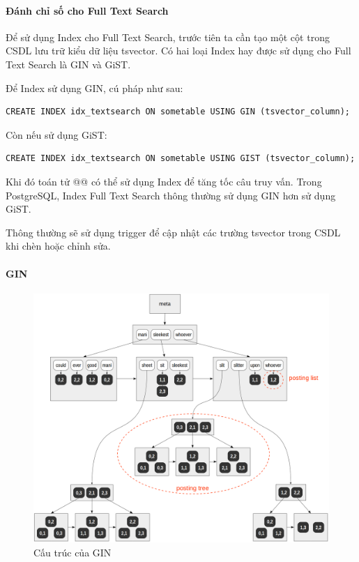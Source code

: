 \paragraph{Đánh chỉ số cho Full Text Search}
Để sử dụng Index cho Full Text Search, trước tiên ta cần tạo
một cột trong CSDL lưu trữ kiểu dữ liệu tsvector.
Có hai loại Index hay được sử dụng cho Full Text Search là GIN và GiST. 

\noindent Để Index sử dụng GIN, cú pháp như sau:
\begin{lstlisting}[caption={Tạo index sử dụng GIN},captionpos=b]
CREATE INDEX idx_textsearch ON sometable USING GIN (tsvector_column);
\end{lstlisting}

\noindent Còn nếu sử dụng GiST:
\begin{lstlisting}[caption={Tạo index sử dụng GiST},captionpos=b]
CREATE INDEX idx_textsearch ON sometable USING GIST (tsvector_column);
\end{lstlisting}

Khi đó toán tử @@ có thể sử dụng Index để
tăng tốc câu truy vấn. Trong PostgreSQL, Index Full Text Search
thông thường sử dụng GIN hơn sử dụng GiST. 

Thông thường sẽ sử dụng trigger để cập nhật các trường
tsvector trong CSDL khi chèn hoặc chỉnh sửa.

\paragraph{GIN}
\begin{figure}[H]
\centering
\includegraphics[width=13cm]{images/GIN.png}
\caption{Cấu trúc của GIN}
\end{figure}

